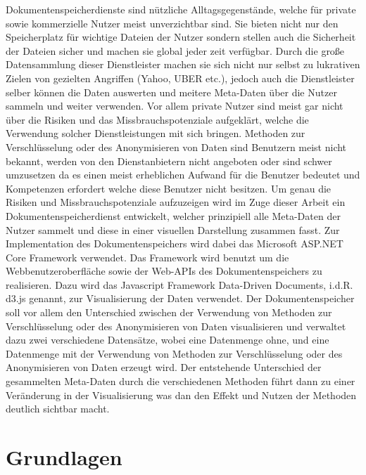 \documentclass[
    fontsize=12pt,
    headings=small,
    parskip=half,           %
    bibliography=totoc,
    numbers=noenddot,       %
    open=any,               %
    ]{scrreprt}
\begin{document}
Dokumentenspeicherdienste sind nützliche Alltagsgegenstände, welche für private sowie kommerzielle Nutzer meist unverzichtbar sind. Sie bieten nicht nur den Speicherplatz für wichtige Dateien der Nutzer sondern stellen auch die Sicherheit der Dateien sicher und machen sie global jeder zeit verfügbar. Durch die große Datensammlung dieser Dienstleister machen sie sich nicht nur selbst zu lukrativen Zielen von gezielten Angriffen (Yahoo, UBER etc.), jedoch auch die Dienstleister selber können die Daten auswerten und meitere Meta-Daten über die Nutzer sammeln und weiter verwenden. Vor allem private Nutzer sind meist gar nicht über die Risiken und das Missbrauchspotenziale aufgeklärt, welche die Verwendung solcher Dienstleistungen mit sich bringen. Methoden zur Verschlüsselung oder des Anonymisieren von Daten sind Benutzern meist nicht bekannt, werden von den Dienstanbietern nicht angeboten oder sind schwer umzusetzen da es einen meist erheblichen Aufwand für die Benutzer bedeutet und Kompetenzen erfordert welche diese Benutzer nicht besitzen. Um genau die Risiken und Missbrauchspotenziale aufzuzeigen wird im Zuge dieser Arbeit ein Dokumentenspeicherdienst entwickelt, welcher prinzipiell alle Meta-Daten der Nutzer sammelt und diese in einer visuellen Darstellung zusammen fasst. Zur Implementation des Dokumentenspeichers wird dabei das Microsoft ASP.NET Core Framework verwendet. Das Framework wird benutzt um die Webbenutzeroberfläche sowie der Web-APIs des Dokumentenspeichers zu realisieren. Dazu wird das Javascript Framework Data-Driven Documents, i.d.R. d3.js genannt, zur Visualisierung der Daten verwendet. Der Dokumentenspeicher soll vor allem den Unterschied zwischen der Verwendung von Methoden zur Verschlüsselung oder des Anonymisieren von Daten visualisieren und verwaltet dazu zwei verschiedene Datensätze, wobei eine Datenmenge ohne, und eine Datenmenge mit der Verwendung von Methoden zur Verschlüsselung oder des Anonymisieren von Daten erzeugt wird. Der entstehende Unterschied der gesammelten Meta-Daten durch die verschiedenen Methoden führt dann zu einer Veränderung in der Visualisierung was dan den Effekt und Nutzen der Methoden deutlich sichtbar macht.  

\chapter{Grundlagen}
\end{document}

